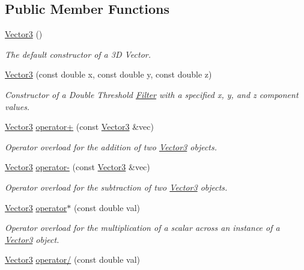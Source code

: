 \subsection*{Public Member Functions}
\begin{DoxyCompactItemize}
\item 
\hyperlink{classVector3_a0f49191f7e001e7f7ae1cb49522118b4}{Vector3} ()
\begin{DoxyCompactList}\small\item\em The default constructor of a 3D Vector. \end{DoxyCompactList}\item 
\hyperlink{classVector3_ac5631420a11b6fbda5ea620877c7425c}{Vector3} (const double x, const double y, const double z)
\begin{DoxyCompactList}\small\item\em Constructor of a Double Threshold \hyperlink{classFilter}{Filter} with a specified x, y, and z component values. \end{DoxyCompactList}\item 
\hyperlink{classVector3}{Vector3} \hyperlink{classVector3_ae8a28dd5a00fa5a2bf5427b0f7a59e58}{operator+} (const \hyperlink{classVector3}{Vector3} \&vec)
\begin{DoxyCompactList}\small\item\em Operator overload for the addition of two \hyperlink{classVector3}{Vector3} objects. \end{DoxyCompactList}\item 
\hyperlink{classVector3}{Vector3} \hyperlink{classVector3_a71264029df074d12dbcd57a95a136fd6}{operator-\/} (const \hyperlink{classVector3}{Vector3} \&vec)
\begin{DoxyCompactList}\small\item\em Operator overload for the subtraction of two \hyperlink{classVector3}{Vector3} objects. \end{DoxyCompactList}\item 
\hyperlink{classVector3}{Vector3} \hyperlink{classVector3_af53c537196154cdc5c3caf6cb9990719}{operator$\ast$} (const double val)
\begin{DoxyCompactList}\small\item\em Operator overload for the multiplication of a scalar across an instance of a \hyperlink{classVector3}{Vector3} object. \end{DoxyCompactList}\item 
\hyperlink{classVector3}{Vector3} \hyperlink{classVector3_af3ab78e4a06b41bd2b3f455301697a13}{operator/} (const double val)

\end{DoxyCompactItemize}
